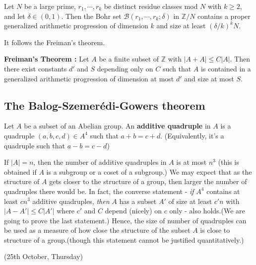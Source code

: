 \documentclass[10pt,a4paper]{report}
\begin{document}
\prop Let $N$ be a large prime, $r_1, \cdots, r_k$ be distinct residue classes mod $N$ with $k\geq 2$, and let $\delta\in (0,1)$. Then the Bohr set $\mathscr{B}(r_1, \cdots, r_k ;\delta)$ in $\mathbb{Z}/N$ contains a proper generalized arithmetic progression of dimension $k$ and size at least $(\delta/k)^k N$.
\s

It follows the Freiman's theorem.
\s

\textbf{Freiman's Theorem :} Let $A$ be a finite subset of $\mathbb{Z}$ with $|A+A|\leq C|A|$. Then there exist constants $d'$ and $S$ depending only on $C$ such that $A$ is contained in a generalized arithmetic progression of dimension at most $d'$ and size at most $S$.
\s

\digression
\s

\subsection*{The Balog-Szemer\'{e}di-Gowers theorem}

 Let $A$ be a subset of an Abelian group. An \textbf{additive quadruple} in $A$ is a quadruple $(a,b,c,d) \in A^4$ such that $a+b = c+d$. (Equivalently, it's a quadruple such that $a-b= c-d$)
\s

If $|A|=n$, then the number of additive quadruples in $A$ is at most $n^3$ (this is obtained if $A$ is a subgroup or a coset of a subgroup.) We may expect that as the structure of $A$ gets closer to the structure of a group, then larger the number of quadruples there would be. In fact, the converse statement - \emph{if} $A^4$ contains at least $cn^3$ additive quadruples, \emph{then} $A$ has a subset $A'$ of size at least $c'n$ with $|A-A'| \leq C|A'|$ where $c'$ and $C$ depend (nicely) on $c$ only - also holds.(We are going to prove the last statement.) Hence, the size of number of quadruples can be used as a measure of how close the structure of the subset $A$ is close to structure of a group.(though this statement cannot be justified quantitatively.)
\s

\newday

(25th October, Thursday)
\s
\end{document}
